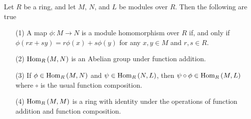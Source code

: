 \begin{lemma}\label{4.2.2}
    Let $R$ be a ring, and let $M$, $N$, and $L$ be modules over $R$. Then the
    following are true
    \begin{enumerate}
        \item[(1)] A map $\phi:M \xrightarrow{} N$ is a module homomorphism over
            $R$ if, and only if $\phi(rx+sy)=r\phi(x)+s\phi(y)$ for any $x,y
            \in M$ and  $r,s \in R$.

        \item[(2)] $\operatorname{Hom}_R{(M,N)}$ is an Abelian group under function addition.

         \item[(3)] If $\phi \in \operatorname{Hom}_R{(M,N)}$ and $\psi \in \operatorname{Hom}_R{(N,L)}$,
             then $\psi \circ \phi \in \operatorname{Hom}_R{(M,L)}$ where $\circ$ is the usual
             function composition.

         \item[(4)] $\operatorname{Hom}_R{(M,M)}$ is a ring with identity under the operations
             of function addition and function composition.
    \end{enumerate}
\end{lemma}
